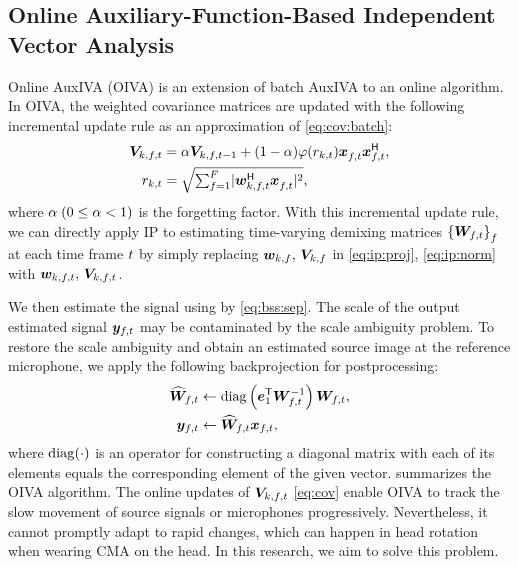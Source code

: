 \documentclass[sip,biber]{now-journal}
\begin{document}
\subsection{Online Auxiliary-Function-Based Independent Vector Analysis}\label{subsec:oiva}

Online AuxIVA (OIVA) \cite{Taniguchi:2014:HSCMA} is an extension of batch AuxIVA to an online algorithm.
In OIVA, the weighted covariance matrices are updated with the following incremental update rule as an approximation of \eqref{eq:cov:batch}:
\begin{align}
  \cov _{\src,\ft} &= \forget \cov _{\src,\ft[-1]} + (1 - \forget) \weight(\var _{\src,\tframe}) \Obs _{\ft} ^{\nohermite} \Obs _{\ft} ^{\hermite}, \label{eq:cov} \\
  \var _{\src,\tframe} &= \textstyle\sqrt{\sum _{\freq=1} ^{\Freq} \lvert \demix ^{\hermite} _{\src,\ft} \Obs ^{\nohermite}_{\ft} \rvert ^2} \label{eq:var},
\end{align}
where $\alpha\; (0 \leq \alpha < 1)$ is the forgetting factor.
With this incremental update rule, we can directly apply IP to estimating time-varying demixing matrices ${\{\Demix _{\ft}\}} _{\freq}$ at each time frame $t$ by simply replacing $\bm{w} _{k,f},\, \bm{V} _{k,f}$ in \eqref{eq:ip:proj}, \eqref{eq:ip:norm} with $\demix _{\src,\ft},\, \cov _{\src,\ft}$.

We then estimate the signal using by \eqref{eq:bss:sep}.
The scale of the output estimated signal $\Est _{\ft}$ may be contaminated by the scale ambiguity problem.
To restore the scale ambiguity and obtain an estimated source image at the reference microphone,
we apply the following backprojection \cite{Murata:2001:NC} for postprocessing:
\begin{align}
  \proj{\Demix} _{\ft}
    &\gets
    \diag\left(\eye _{1} ^{\top} \Demix _{\ft} ^{-1} \right) \Demix _{\ft},
    \label{eq:pb:w}
    \\
  \Est _{\ft}
    &\gets
    \proj{\Demix }_{\ft} \Obs _{\ft},
    \label{eq:pb:y}
\end{align}
where $\operatorname{diag}(\cdot)$ is an operator for constructing a diagonal matrix with each of its elements equals the corresponding element of the given vector.
 summarizes the OIVA algorithm.
The online updates of $\cov _{\src,\ft}$ \eqref{eq:cov} enable OIVA to track the slow movement of source signals or microphones progressively.
Nevertheless, it cannot promptly adapt to rapid changes, which can happen in head rotation when wearing CMA on the head.
In this research, we aim to solve this problem.
\end{document}
